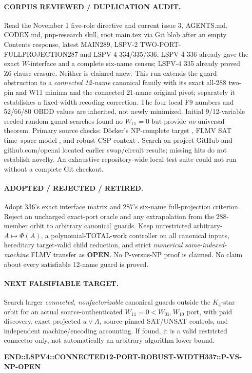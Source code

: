 \documentclass[11pt]{article}
\begin{document}
\paragraph{CORPUS REVIEWED / DUPLICATION AUDIT.} Read the November 1 five-role directive and current issue 3, AGENTS.md, CODEX.md, pnp-research skill, root main.tex via Git blob after an empty Contents response, latest MAIN289, LSPV-2 TWO-PORT-FULLPROJECTION287 and LSPV-4 334/335/336. LSPV-4 336 already gave the exact $W$-interface and a complete six-name census; LSPV-4 335 already proved Z6 clause erasure. Neither is claimed anew. This run extends the guard obstruction to a \emph{connected 12-name} canonical family with its exact all-288 two-pin and W11 minima and the connected 21-name original pivot; separately it establishes a fixed-width recoding correction. The four local F9 numbers and 52/66/80 OBDD values are inherited, not newly minimized. Initial 9/12-variable seeded random guard searches found no $W_{11}=0$ but provide \emph{no} universal theorem. Primary source checks: D\"ocker's NP-complete target \cite{docker2019}, FLMV SAT time--space model \cite{flmv2005}, and robust CSP context \cite{abramsky2013}. Search on project GitHub and github.com/openai located earlier swap/circuit results; missing hits do not establish novelty. An exhaustive repository-wide local test suite could not run without a complete Git checkout.

\paragraph{ADOPTED / REJECTED / RETIRED.} Adopt 336's exact interface matrix and 287's six-name full-projection criterion. Reject an uncharged exact-port oracle and any extrapolation from the 288-member orbit to arbitrary canonical guards. Keep unrestricted arbitrary-$A\mapsto\Phi(A)$, a polynomial-TOTAL-work controller on all canonical inputs, hereditary target-valid child reduction, and strict \emph{numerical same-indexed-machine} FLMV transfer as \textbf{OPEN}. No P-versus-NP proof is claimed. No claim about every satisfiable 12-name guard is proved.

\paragraph{NEXT FALSIFIABLE TARGET.} Search larger \emph{connected, nonfactorizable} canonical guards outside the $K_4$-star orbit for an actual source-authenticated $W_{11}=0<W_{01},W_{10}$ port, with paid discovery, exact projected $u\vee A$, source-pinned SAT/UNSAT controls, and independent machine/encoding accounting. If found, it is a valid restricted connector only, not automatically an arbitrary-algorithm lower bound.



\noindent\textbf{END::LSPV4::CONNECTED12-PORT-ROBUST-WIDTH337::P-VS-NP-OPEN}
\end{document}
